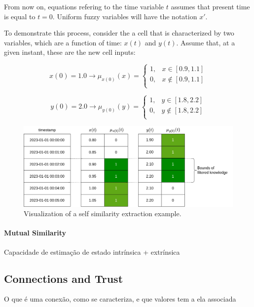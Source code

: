 From now on, equations refering to the time variable $t$ assumes that present time is equal to $t=0$. Uniform fuzzy variables will have the notation $x'$.


To demonstrate this process, consider the a cell that is characterized by two variables, which are a function of time: $x(t)$ and $y(t)$. 
Assume that, at a given instant, these are the new cell inputs:

\begin{equation}
x(0) = 1.0 \rightarrow \mu_{x(0)}(x) =
\begin{cases}
1, & x \in [0.9, 1.1] \\
0, & x \notin [0.9, 1.1] \\
\end{cases}
\end{equation}

\begin{equation}
y(0) = 2.0 \rightarrow \mu_{y(0)}(y) =
\begin{cases}
1, & y \in [1.8, 2.2] \\
0, & y \notin [1.8, 2.2] \\
\end{cases}
\end{equation}

\begin{figure}[h!]
    \centering
    \includegraphics[width=\linewidth]{figures/chapter4/cell/solo_state_estimation.drawio.png}
    \caption{Visualization of a self similarity extraction example.}
    \label{fig:solo_state_estimation}
\end{figure}
 
\paragraph{Mutual Similarity}
Capacidade de estimação de estado intrínsica + extrínsica

\subsection{Connections and Trust}
O que é uma conexão, como se caracteriza, e que valores tem a ela associada
